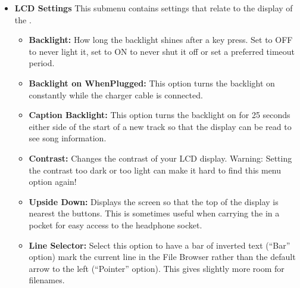 \begin{itemize}
\begin{itemize}
  \item \textbf{LCD Settings}
    This submenu contains settings that relate to the display of the \dap.
    \begin{itemize}
    \item \textbf{Backlight:} 
      How long the backlight shines after a key press. Set to OFF to never light it, set to ON to never shut it off or set a preferred timeout period.
    \item \textbf{Backlight on WhenPlugged:}
      This option turns the backlight on constantly while the charger cable is connected.
    \item \textbf{Caption Backlight:} This option turns the backlight on for 25 seconds either side of the start of a new track so that the display can be read to see song information.
    \item \textbf{Contrast:} Changes the contrast of your LCD display. Warning: Setting the contrast too dark or too light can make it hard to find this menu option again!
    \item \textbf{Upside Down: }Displays the screen so that the top of the display is nearest the buttons.  This is sometimes useful when carrying the \dap in a pocket for easy access to the headphone socket.
    \item \textbf{Line Selector: }Select this option to have a bar of inverted text (``Bar'' option) mark the current line in the File Browser rather than the default arrow to the left (``Pointer'' option).  This gives slightly more room for filenames.
    \end{itemize}
    

\end{itemize}
\end{itemize}
